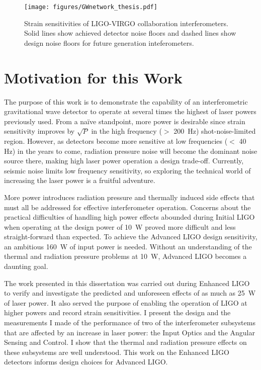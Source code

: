 \begin{figure}
\begin{centering}
\texttt{[image: figures/GWnetwork\_thesis.pdf]}
\caption[Strain sensitivities of LIGO-VIRGO collaboration
interferometers]{Strain sensitivities of LIGO-VIRGO collaboration
  interferometers. Solid lines show achieved detector noise floors and
  dashed lines show design noise floors for future generation
  inteferometers.}
\label{fig:h_all}
\end{centering}
\end{figure}


\section{Motivation for this Work}
The purpose of this work is to demonstrate the capability of an
interferometric gravitational wave detector to operate at several
times the highest of laser powers previously used. From a na\"ive
standpoint, more power is desirable since strain sensitivity improves
by $\sqrt{P}$ in the high frequency ($>$ 200~Hz) shot-noise-limited
region. However, as detectors become more sensitive at low frequencies
($<$ 40 Hz) in the years to come, radiation pressure noise will become
the dominant noise source there, making high laser power operation a
design trade-off. Currently, seismic noise limits low frequency
sensitivity, so exploring the technical world of increasing the laser
power is a fruitful adventure.

More power introduces radiation pressure and thermally induced side
effects that must all be addressed for effective interferometer
operation. Concerns about the practical difficulties of handling high
power effects abounded during Initial LIGO when operating at the
design power of 10~W proved more difficult and less straight-forward
than expected. To achieve the Advanced LIGO design sensitivity, an
ambitious 160~W of input power is needed. Without an understanding of
the thermal and radiation pressure problems at 10~W, Advanced LIGO
becomes a daunting goal.

The work presented in this dissertation was carried out during
Enhanced LIGO to verify and investigate the predicted and unforeseen
effects of as much as 25~W of laser power. It also served the purpose
of enabling the operation of LIGO at higher powers and record strain
sensitivities. I present the design and the measurements I made of the
performance of two of the interferometer subsystems that are affected
by an increase in laser power: the Input Optics and the Angular
Sensing and Control. I show that the thermal and radiation pressure
effects on these subsystems are well understood. This work on the
Enhanced LIGO detectors informs design choices for Advanced LIGO.

